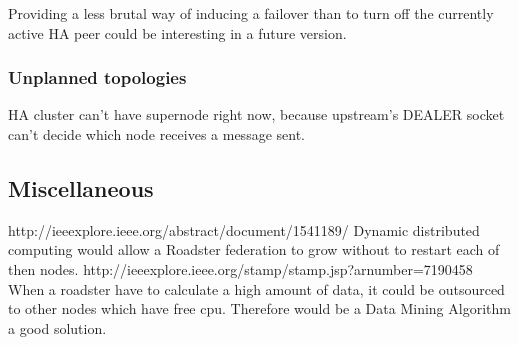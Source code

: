 Providing a less brutal way of inducing a failover than to turn off the
currently active HA peer could be interesting in a future version.

\subsubsection{Unplanned topologies}
HA cluster can't have supernode right now, because upstream's DEALER socket
can't decide which node receives a message sent.

\subsection{Miscellaneous}
http://ieeexplore.ieee.org/abstract/document/1541189/ Dynamic distributed computing would allow a Roadster federation to grow without to restart each of then nodes.
http://ieeexplore.ieee.org/stamp/stamp.jsp?arnumber=7190458 When a roadster have to calculate a high amount of data, it could be outsourced to other nodes which have free cpu.
Therefore would be a Data Mining Algorithm a good solution.

